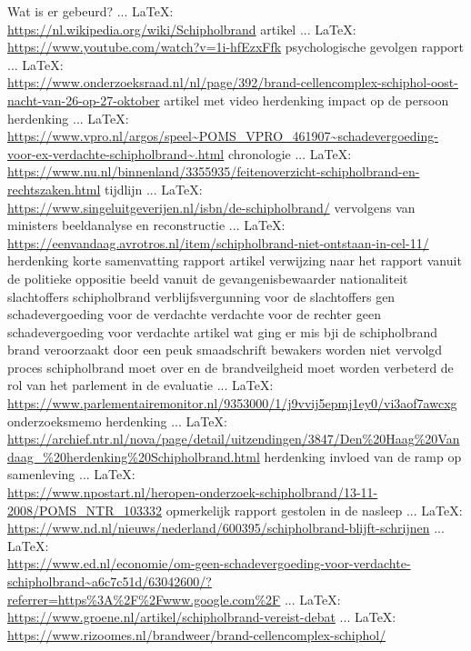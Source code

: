 \begin{thebibliography}{99}
{{{{{{{	Wat is er gebeurd?
	 ... \LaTeX:\\ \url{https://nl.wikipedia.org/wiki/Schipholbrand}
	artikel
	 ... \LaTeX:\\ \url{https://www.youtube.com/watch?v=1i-hfEzxFfk}
	psychologische gevolgen
	rapport
	 ... \LaTeX:\\ \url{https://www.onderzoeksraad.nl/nl/page/392/brand-cellencomplex-schiphol-oost-nacht-van-26-op-27-oktober}
	artikel met video
	herdenking
	impact op de persoon
	herdenking
	 ... \LaTeX:\\ \url{https://www.vpro.nl/argos/speel~POMS_VPRO_461907~schadevergoeding-voor-ex-verdachte-schipholbrand~.html}
	chronologie
	 ... \LaTeX:\\ \url{https://www.nu.nl/binnenland/3355935/feitenoverzicht-schipholbrand-en-rechtszaken.html}
	tijdlijn
	 ... \LaTeX:\\ \url{https://www.singeluitgeverijen.nl/isbn/de-schipholbrand/}
	vervolgens van ministers
	beeldanalyse en reconstructie
	 ... \LaTeX:\\ \url{https://eenvandaag.avrotros.nl/item/schipholbrand-niet-ontstaan-in-cel-11/}
	herdenking
	korte samenvatting
	rapport
	artikel
	verwijzing naar het rapport vanuit de politieke oppositie
	beeld vanuit de gevangenisbewaarder
	nationaliteit slachtoffers schipholbrand
	verblijfsvergunning voor de slachtoffers
	gen schadevergoeding voor de verdachte
	verdachte voor de rechter
	geen schadevergoeding voor verdachte
	artikel wat ging er mis bji de schipholbrand
	brand veroorzaakt door een peuk
	smaadschrift
	bewakers worden niet vervolgd
	proces schipholbrand moet over en de brandveilgheid moet worden verbeterd
	de rol van het parlement in de evaluatie
	 ... \LaTeX:\\ \url{https://www.parlementairemonitor.nl/9353000/1/j9vvij5epmj1ey0/vi3aof7awcxg}
	onderzoeksmemo
	herdenking
	 ... \LaTeX:\\ \url{https://archief.ntr.nl/nova/page/detail/uitzendingen/3847/Den%20Haag%20Vandaag_%20herdenking%20Schipholbrand.html}
	herdenking
	invloed van de ramp op samenleving
	 ... \LaTeX:\\ \url{https://www.npostart.nl/heropen-onderzoek-schipholbrand/13-11-2008/POMS_NTR_103332}
	opmerkelijk rapport gestolen in de nasleep
	 ... \LaTeX:\\ \url{https://www.nd.nl/nieuws/nederland/600395/schipholbrand-blijft-schrijnen}
	 ... \LaTeX:\\ \url{https://www.ed.nl/economie/om-geen-schadevergoeding-voor-verdachte-schipholbrand~a6c7c51d/63042600/?referrer=https%3A%2F%2Fwww.google.com%2F}
	 ... \LaTeX:\\ \url{https://www.groene.nl/artikel/schipholbrand-vereist-debat}
	 ... \LaTeX:\\ \url{https://www.rizoomes.nl/brandweer/brand-cellencomplex-schiphol/}
	
}}}}}}}
\end{thebibliography}
